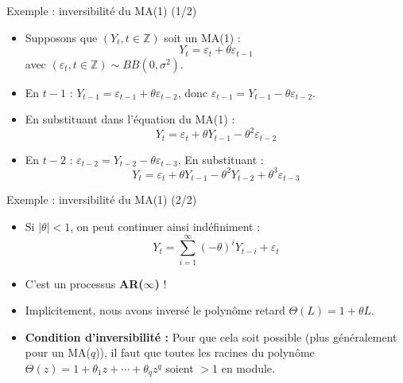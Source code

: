 \documentclass[11pt,aspectratio=169]{beamer}
\newcommand{\Z}{\mathbb{Z}}
\begin{document}
\begin{frame}{Exemple : inversibilité du MA(1) (1/2)}

\begin{itemize}

\item Supposons que $(Y_t, t \in \Z)$ soit un MA(1) :
\[
Y_t = \varepsilon_t + \theta \varepsilon_{t-1}
\]
avec $(\varepsilon_t, t \in \Z) \sim BB(0, \sigma^2)$.\newline

\item En $t-1$ : $Y_{t-1} = \varepsilon_{t-1} + \theta \varepsilon_{t-2}$, donc $\varepsilon_{t-1} = Y_{t-1} - \theta \varepsilon_{t-2}$.\newline

\item En substituant dans l'équation du MA(1) :
\[
Y_t = \varepsilon_t + \theta Y_{t-1} - \theta^2 \varepsilon_{t-2}
\]

\item En $t-2$ : $\varepsilon_{t-2} = Y_{t-2} - \theta \varepsilon_{t-3}$. En substituant :
\[
Y_t = \varepsilon_t + \theta Y_{t-1} - \theta^2 Y_{t-2} + \theta^3 \varepsilon_{t-3}
\]

\end{itemize}
\end{frame}

\begin{frame}{Exemple : inversibilité du MA(1) (2/2)}

\begin{itemize}

\item Si $|\theta| < 1$, on peut continuer ainsi indéfiniment :
\[
Y_t = \sum_{i=1}^{\infty} (-\theta)^i Y_{t-i} + \varepsilon_t
\]

\item C'est un processus \textbf{AR($\infty$)} !\newline

\item Implicitement, nous avons inversé le polynôme retard $\Theta(L) = 1 + \theta L$.\newline

\item \textbf{Condition d'inversibilité :} Pour que cela soit possible (plus généralement pour un MA($q$)), il faut que toutes les racines du polynôme $\Theta(z) = 1 + \theta_1 z + \cdots + \theta_q z^q$ soient $> 1$ en module.

\end{itemize}
\end{frame}
\end{document}
